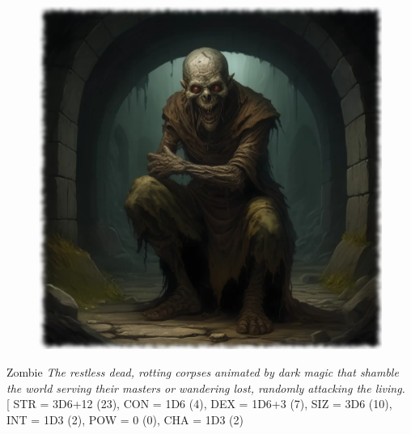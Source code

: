 	
\newpage

\vphantom{.}\\
\vphantom{.}\\
\vphantom{.}\\
\vphantom{.}\\

\begin{samepage}
\begin{figure}[h]
\begin{center}
\includegraphics[scale=0.24]{img/ai-images/zombie.png}
\end{center}
\end{figure}
\begin{monsterbox}{Zombie}
	\textit{The restless dead, rotting corpses animated by dark magic that shamble the world serving their masters or wandering lost, randomly attacking the living.}\\
	\rpghline
	\basics[%
        hitpoints  = 7, 
	majorwound = 4,
	damagemodifier = +1D6,
	powerpoints = 0,
	movementrate = 7m,
	armor = None,
	plunderrating = 0
	]
	\rpghline%
	\stats[ %
		STR = 3D6+12 (23),
		CON = 1D6    (4),
		DEX = 1D6+3  (7),
		SIZ = 3D6    (10),
		INT = 1D3    (2),
		POW = 0      (0),
		CHA = 1D3    (2)

\end{monsterbox}
\end{samepage}
